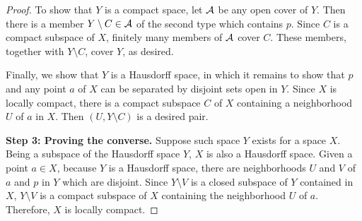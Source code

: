 \begin{proof}
    To show that $Y$ is a compact space, let ${\mathcal{A}}$ be any open cover of $Y$.
    Then there is a member $Y\setminus C\in{\mathcal{A}}$ of the second type which contains $p$.
    Since $C$ is a compact subspace of $X$, finitely many members of ${\mathcal{A}}$ cover $C$.
    These members, together with $Y\setminus C$, cover $Y$, as desired.

    Finally, we show that $Y$ is a Hausdorff space, in which it remains to show that $p$ and any point $a$ of $X$ can be separated by disjoint sets open in $Y$.
    Since $X$ is locally compact, there is a compact subspace $C$ of $X$ containing a neighborhood $U$ of $a$ in $X$.
    Then $(U, Y\setminus C)$ is a desired pair.

    \textbf{Step 3: Proving the converse.}\newline\noindent
    Suppose such space $Y$ exists for a space $X$.
    Being a subspace of the Hausdorff space $Y$, $X$ is also a Hausdorff space.
    Given a point $a\in X$, because $Y$ is a Hausdorff space, there are neighborhoods $U$ and $V$ of $a$ and $p$ in $Y$ which are disjoint.
    Since $Y\setminus V$ is a closed subspace of $Y$ contained in $X$, $Y\setminus V$ is a compact subspace of $X$ containing the neighborhood $U$ of $a$.
    Therefore, $X$ is locally compact.
\end{proof}

